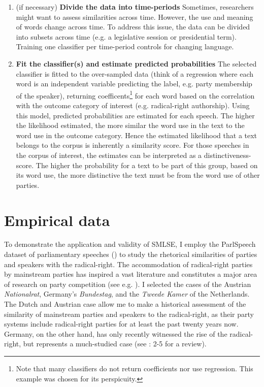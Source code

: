 \documentclass{article}
\begin{document}
\begin{enumerate}
    \item (if necessary) \textbf{Divide the data into time-periods} \newline Sometimes, researchers might want to assess similarities across time. However, the use and meaning of words change across time. To address this issue, the data can be divided into subsets across time (e.g. a legislative session or presidential term). Training one classifier per time-period controls for changing language.\par
    \item \textbf{Fit the classifier(s) and estimate predicted probabilities} \newline The selected classifier is fitted to the over-sampled data (think of a regression where each word is an independent variable predicting the label, e.g. party membership of the speaker), returning coefficents\footnote{Note that many classifiers do not return coefficients nor use regression. This example was chosen for its perspicuity.} for each word based on the correlation with the outcome category of interest (e.g. radical-right authorship). Using this model, predicted probabilities are estimated for each speech. The higher the likelihood estimated, the more similar the word use in the text to the word use in the outcome category. Hence the estimated likelihood that a text belongs to the corpus is inherently a similarity score. For those speeches in the corpus of interest, the estimates can be interpreted as a distinctiveness-score. The higher the probability for a text to be part of this group, based on its word use, the more distinctive the text must be from the word use of other parties.\par 
\end{enumerate}



\section{Empirical data}
To demonstrate the application and validity of SMLSE, I employ the ParlSpeech dataset of parliamentary speeches (\cite{Rauh2020}) to study the rhetorical similarities of parties and speakers with the radical-right. The accommodation of radical-right parties by mainstream parties has inspired a vast literature and constitutes a major area of research on party competition (see e.g. \cite{Arzheimer2009, Bale2010e, Dahlstrom2012a, Harmel1997a, Krause2019accomodation, Meguid2005b, Schumacher2014a, Spoon2020a, VanDerBrug2005b, VanSpanje2010, Wagner2017}). I selected the cases of the Austrian \textit{Nationalrat}, Germany's \textit{Bundestag}, and the \textit{Tweede Kamer} of the Netherlands. The Dutch and Austrian case allow me to make a historical assessment of the similarity of mainstream parties and speakers to the radical-right, as their party systems include radical-right parties for at least the past twenty years now. Germany, on the other hand, has only recently witnessed the rise of the radical-right, but represents a much-studied case (see \cite{Arzheimer2019}: 2-5 for a review).\par
\end{document}
